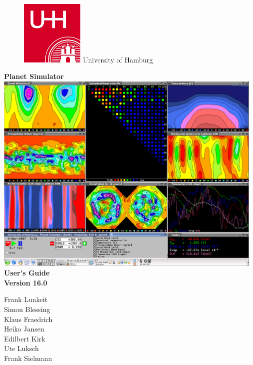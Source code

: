 \documentclass[12pt,twoside,a4paper]{book}
\newcommand{\plasim}{\bf Planet Simulator}
\begin{document}
\begin{titlepage}
\begin{figure}
\includegraphics[width=3cm]{Pics/uhhlogo}
{\textsf{\huge University of Hamburg}}
\end{figure}
\vspace*{1cm}
\begin{center}
{\Huge\bf \plasim} \\
\vspace*{1cm}
\includegraphics[width=13cm]{Pics/snaplasim} \\
\vspace*{1cm}
{\huge \bf User's Guide } \\
\vspace*{1cm}
{\huge \bf Version 16.0}
\vspace*{1cm}

 Frank Lunkeit   \\
 Simon Blessing  \\
 Klaus Fraedrich \\
 Heiko Jansen    \\
 Edilbert Kirk   \\ 
 Ute Luksch      \\
 Frank Sielmann  \\

\end{center}
\end{titlepage}
\end{document}
